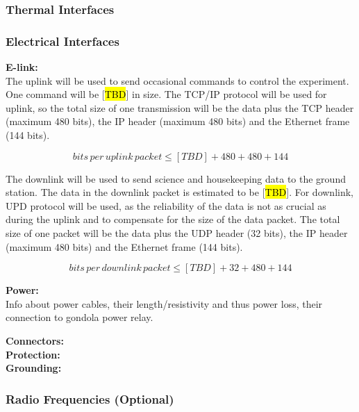 % 


\subsubsection{Thermal Interfaces}
\label{sec:4.2.2}


\subsubsection{Electrical Interfaces}
\label{sec:4.2.3}
\textbf{E-link:}\\
The uplink will be used to send occasional commands to control the experiment. One command will be [\hl{TBD}] in size. The TCP/IP protocol will be used for uplink, so the total size of one transmission will be the data plus the TCP header (maximum 480 bits), the IP header (maximum 480 bits) and the Ethernet frame (144 bits). 

$$ bits\, per\, uplink\, packet \leq [TBD] + 480 + 480 + 144 $$

The downlink will be used to send science and housekeeping data to the ground station. The data in the downlink packet is estimated to be [\hl{TBD}]. For downlink, UPD protocol will be used, as the reliability of the data is not as crucial as during the uplink and to compensate for the size of the data packet. The total size of one packet will be the data plus the UDP header (32 bits), the IP header (maximum 480 bits) and the Ethernet frame (144 bits).

$$ bits\, per\, downlink\, packet \leq [TBD] + 32 + 480 + 144 $$

\textbf{Power:}\\
Info about power cables, their length/resistivity and thus power loss, their connection to gondola power relay. 



\textbf{Connectors:}\\

\textbf{Protection:}\\

\textbf{Grounding:}\\


\subsubsection{Radio Frequencies (Optional)}



\raggedbottom